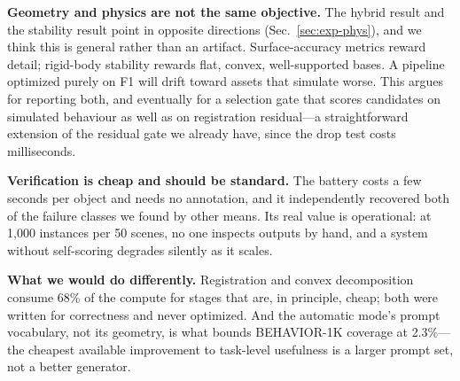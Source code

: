 \textbf{Geometry and physics are not the same objective.} The hybrid
result and the stability result point in opposite directions
(Sec.~\ref{sec:exp-phys}), and we think this is general rather than an
artifact. Surface-accuracy metrics reward detail; rigid-body stability
rewards flat, convex, well-supported bases. A pipeline optimized purely on
F1 will drift toward assets that simulate worse. This argues for reporting
both, and eventually for a selection gate that scores candidates on
simulated behaviour as well as on registration residual---a
straightforward extension of the residual gate we already have, since the
drop test costs milliseconds.

\textbf{Verification is cheap and should be standard.} The battery costs a
few seconds per object and needs no annotation, and it independently
recovered both of the failure classes we found by other means. Its real
value is operational: at 1{,}000 instances per 50 scenes, no one inspects
outputs by hand, and a system without self-scoring degrades silently as it
scales.

\textbf{What we would do differently.} Registration and convex
decomposition consume 68\% of the compute for stages that are, in
principle, cheap; both were written for correctness and never optimized.
And the automatic mode's prompt vocabulary, not its geometry, is what
bounds BEHAVIOR-1K coverage at 2.3\%---the cheapest available improvement
to task-level usefulness is a larger prompt set, not a better generator.
\fi


